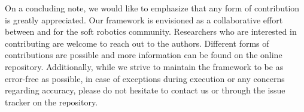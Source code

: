 On a concluding note, we would like to emphasize that any form of contribution is greatly appreciated. Our framework is envisioned as a collaborative effort between and for the soft robotics community. Researchers who are interested in contributing are welcome to reach out to the authors. Different forms of contributions are possible and more information can be found on the online repository. Additionally, while we strive to maintain the framework to be as error-free as possible, in case of exceptions during execution or any concerns regarding accuracy, please do not hesitate to contact us or through the issue tracker on the repository.
